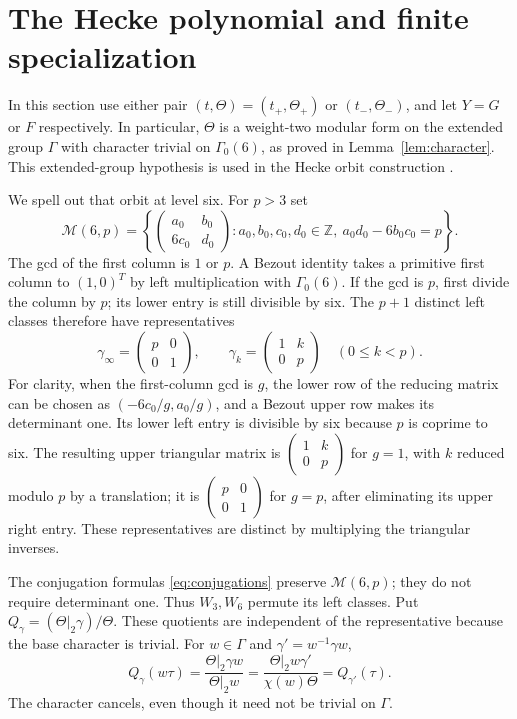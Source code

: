 \documentclass[11pt,a4paper]{article}
\theoremstyle{remark}\newtheorem{remark}[theorem]{Remark}
\newcommand{\Z}{\mathbb Z}\newcommand{\Q}{\mathbb Q}
\newcommand{\smat}[4]{\begin{pmatrix}#1&#2\\#3&#4\end{pmatrix}}
\begin{document}
\section{The Hecke polynomial and finite specialization}
\label{sec:Hecke}
In this section use either pair $(t,\Theta)=(t_+,\Theta_+)$ or
$(t_-,\Theta_-)$, and let $Y=G$ or $F$ respectively.
In particular, $\Theta$ is a weight-two modular form on the extended
group $\Gamma$ with character trivial on $\Gamma_0(6)$, as proved in
Lemma~\ref{lem:character}. This extended-group hypothesis is used in
the Hecke orbit construction \cite[Lemma~3.7]{beukers}.

We spell out that orbit at level six. For $p>3$ set
\[
 \mathcal M(6,p)=
 \left\{\smat{a_0}{b_0}{6c_0}{d_0}:
 a_0,b_0,c_0,d_0\in\Z,\ a_0d_0-6b_0c_0=p\right\}.
\]
The gcd of the first column is $1$ or $p$.
A Bezout identity takes a primitive first column to $(1,0)^T$ by left
multiplication with $\Gamma_0(6)$. If the gcd is $p$, first divide the
column by $p$; its lower entry is still divisible by six.
The $p+1$ distinct left classes therefore have representatives
\begin{equation}\label{eq:Hecke-reps}
 \gamma_\infty=\smat p001,
 \qquad \gamma_k=\smat1k0p\quad(0\le k<p).
\end{equation}
For clarity, when the first-column gcd is $g$, the lower row of the
reducing matrix can be chosen as $(-6c_0/g,a_0/g)$, and a Bezout upper
row makes its determinant one. Its lower left entry is divisible by six
because $p$ is coprime to six. The resulting upper triangular matrix is
$\smat1k0p$ for $g=1$, with $k$ reduced modulo $p$ by a translation;
it is $\smat p001$ for $g=p$, after eliminating its upper right entry.
These representatives are distinct by multiplying the triangular inverses.

The conjugation formulas \eqref{eq:conjugations} preserve
$\mathcal M(6,p)$; they do not require determinant one. Thus $W_3,W_6$
permute its left classes. Put $Q_\gamma=(\Theta|_2\gamma)/\Theta$.
These quotients are independent of the representative because the base
character is trivial. For $w\in\Gamma$ and $\gamma'=w^{-1}\gamma w$,
\[
 Q_\gamma(w\tau)
 =\frac{\Theta|_2\gamma w}{\Theta|_2w}
 =\frac{\Theta|_2w\gamma'}{\chi(w)\Theta}
 =Q_{\gamma'}(\tau).
\]
The character cancels, even though it need not be trivial on $\Gamma$.
\end{document}
